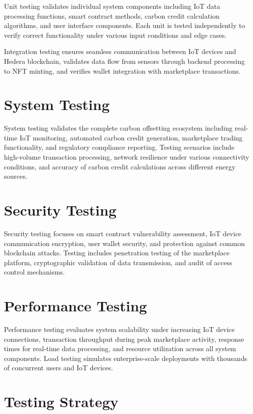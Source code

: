 \documentclass[oneside,a4paper,12pt]{book}
\begin{document}
Unit testing validates individual system components including IoT data processing functions, smart contract methods, carbon credit calculation algorithms, and user interface components. Each unit is tested independently to verify correct functionality under various input conditions and edge cases.

Integration testing ensures seamless communication between IoT devices and Hedera blockchain, validates data flow from sensors through backend processing to NFT minting, and verifies wallet integration with marketplace transactions.

\section{System Testing}
System testing validates the complete carbon offsetting ecosystem including real-time IoT monitoring, automated carbon credit generation, marketplace trading functionality, and regulatory compliance reporting. Testing scenarios include high-volume transaction processing, network resilience under various connectivity conditions, and accuracy of carbon credit calculations across different energy sources.

\section{Security Testing}
Security testing focuses on smart contract vulnerability assessment, IoT device communication encryption, user wallet security, and protection against common blockchain attacks. Testing includes penetration testing of the marketplace platform, cryptographic validation of data transmission, and audit of access control mechanisms.

\section{Performance Testing}
Performance testing evaluates system scalability under increasing IoT device connections, transaction throughput during peak marketplace activity, response times for real-time data processing, and resource utilization across all system components. Load testing simulates enterprise-scale deployments with thousands of concurrent users and IoT devices.

\section{Testing Strategy}
\end{document}
